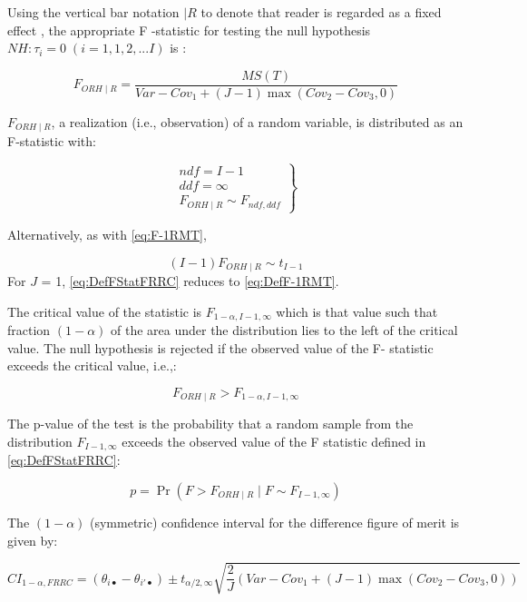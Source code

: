 \documentclass[
]{book}
\begin{document}
Using the vertical bar notation \(\mid R\) to denote that reader is regarded as a fixed effect \citep{RN1124}, the appropriate F -statistic for testing the null hypothesis \(NH: \tau_i = 0 \; (i=1,1,2,...I)\) is \citep{RN1865}:

\begin{equation}
F_{ORH \mid R}=\frac{MS(T)}{Var-Cov_1+(J-1)\max(Cov_2-Cov_3,0)}
\label{eq:DefFStatFRRC}
\end{equation}

\(F_{ORH \mid R}\), a realization (i.e., observation) of a random variable, is distributed as an F-statistic with:

\begin{equation}
\left.\begin{matrix}
ndf=I-1\\ 
ddf=\infty\\
F_{ORH \mid R} \sim F_{ndf,ddf}
\end{matrix}\right\}
\label{eq:FStatFRRC}
\end{equation}

Alternatively, as with \eqref{eq:F-1RMT},

\[(I-1)F_{ORH \mid R} \sim t_{I-1}\]
For \(J\) = 1, \eqref{eq:DefFStatFRRC} reduces to \eqref{eq:DefF-1RMT}.

The critical value of the statistic is \(F_{1-\alpha,I-1,\infty}\) which is that value such that fraction \((1-\alpha)\) of the area under the distribution lies to the left of the critical value. The null hypothesis is rejected if the observed value of the F- statistic exceeds the critical value, i.e.,:

\[F_{ORH \mid R}>F_{1-\alpha,I-1,\infty}\]

The p-value of the test is the probability that a random sample from the distribution \(F_{I-1,\infty}\) exceeds the observed value of the F statistic defined in \eqref{eq:DefFStatFRRC}:

\begin{equation}
p=\Pr(F>F_{ORH \mid R} \mid F \sim F_{I-1,\infty})
\label{eq:pValueaphaFRRC}
\end{equation}

The \((1-\alpha)\) (symmetric) confidence interval for the difference figure of merit is given by:

\begin{equation}
CI_{1-\alpha,FRRC}=(\theta_{i \bullet} - \theta_{i' \bullet}) \pm t_{\alpha/2, \infty}\sqrt{\frac{2}{J}(Var-Cov_1+(J-1)\max(Cov_2-Cov_3,0))}
\label{eq:CIalphaFRRC}
\end{equation}
\end{document}
